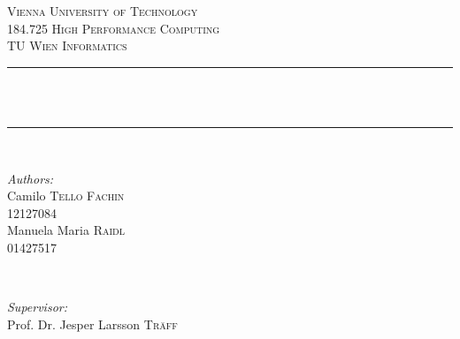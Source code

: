 \begin{titlepage}

\newcommand{\HRule}{\rule{\linewidth}{0.5mm}} %

\center %
 

\textsc{\LARGE Vienna University of Technology}\\[1.5cm] %
\textsc{\Large 184.725 High Performance Computing}\\[0.5cm] %
\textsc{\large TU Wien Informatics}\\[0.5cm] %


\HRule \\[0.5cm]
{ \huge \bfseries \doctitle}\\[1mm] %
\HRule \\[0.5cm]
 

\begin{minipage}{0.4\textwidth}
\begin{flushleft} \large
\emph{Authors:}\\
Camilo \textsc{Tello Fachin}\\
12127084 \\
Manuela Maria \textsc{Raidl}\\
01427517 \\

\end{flushleft}
\end{minipage}
~
\begin{minipage}{0.4\textwidth}
\begin{flushright} \large
\emph{Supervisor:} \\
Prof. Dr. Jesper Larsson \textsc{Träff} \\ %
\end{flushright}
\end{minipage}\\[1.5cm]


\end{titlepage}
